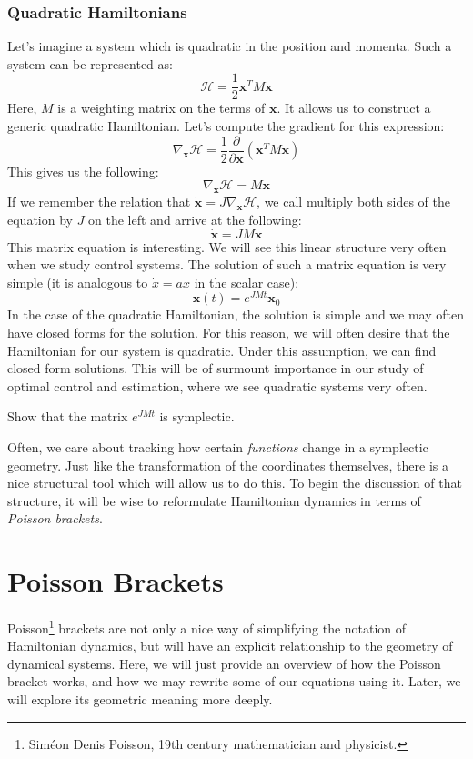 \subsubsection{Quadratic Hamiltonians}
Let's imagine a system which is quadratic in the position and momenta. Such a system can be represented as:
$$\mathcal{H}=\frac{1}{2}\bm{x}^TM\bm{x}$$
Here, $M$ is a weighting matrix on the terms of $\bm{x}$. It allows us to construct a generic quadratic \gls{Hamiltonian}. Let's compute the gradient for this expression:
$$\nabla_{\bm{x}}\mathcal{H}=\frac{1}{2}\frac{\partial}{\partial \bm{x}}\left(\bm{x}^TM\bm{x}\right)$$
This gives us the following:
$$\nabla_{\bm{x}}\mathcal{H}=M\bm{x}$$
If we remember the relation that $\bm{\dot{x}}=J\nabla_{\bm{x}}\mathcal{H}$, we call multiply both sides of the equation by $J$ on the left and arrive at the following:
$$\bm{\dot{x}}=JM\bm{x}$$
This matrix equation is interesting. We will see this linear structure very often when we study control systems. The solution of such a matrix equation is very simple (it is analogous to $\dot{x}=ax$ in the scalar case):
$$\bm{x}(t)=e^{JMt}\bm{x}_0$$
In the case of the quadratic \gls{Hamiltonian}, the solution is simple and we may often have closed forms for the solution. For this reason, we will often desire that the \gls{Hamiltonian} for our system is quadratic. Under this assumption, we can find closed form solutions. This will be of surmount importance in our study of optimal control and estimation, where we see quadratic systems very often.

\begin{exercise}
Show that the matrix $e^{JMt}$ is symplectic.
\end{exercise}


Often, we care about tracking how certain \textit{functions} change in a symplectic geometry. Just like the transformation of the coordinates themselves, there is a nice structural tool which will allow us to do this. To begin the discussion of that structure, it will be wise to reformulate \gls{Hamiltonian} dynamics in terms of \textit{Poisson brackets}.

\section{Poisson Brackets}
Poisson\footnote{Sim\'eon Denis Poisson, 19th century mathematician and physicist.} brackets are not only a nice way of simplifying the notation of Hamiltonian dynamics, but will have an explicit relationship to the geometry of dynamical systems. Here, we will just provide an overview of how the Poisson bracket works, and how we may rewrite some of our equations using it. Later, we will explore its geometric meaning more deeply.

